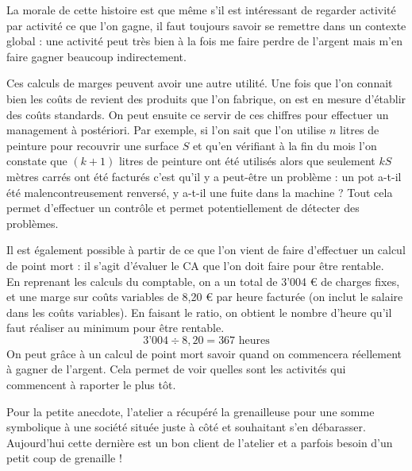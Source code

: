 La morale de cette histoire est que même s'il est intéressant 
de regarder activité par activité ce que l'on gagne, il faut 
toujours savoir se remettre dans un contexte global : une activité 
peut très bien à la fois me faire perdre de l'argent mais m'en 
faire gagner beaucoup indirectement. 

Ces calculs de marges peuvent avoir une autre utilité. 
Une fois que l'on connait bien les coûts de revient des produits que 
l'on fabrique, on est en mesure d'établir des coûts standards. 
On peut ensuite ce servir de ces chiffres pour effectuer un 
management à postériori. 
Par exemple, si l'on sait que l'on utilise $n$ litres de peinture 
pour recouvrir une surface $S$ et qu'en vérifiant à la fin du mois 
l'on constate que $(k+1)$ litres de peinture ont été utilisés alors que 
seulement $kS$ mètres carrés ont été facturés c'est qu'il y a peut-être 
un problème : un pot a-t-il été malencontreusement renversé, y a-t-il une 
fuite dans la machine ?
Tout cela permet d'effectuer un contrôle et permet potentiellement de 
détecter des problèmes.

Il est également possible à partir de ce que l'on vient de faire 
d'effectuer un calcul de point mort : il s'agit d'évaluer le CA 
que l'on doit faire pour être rentable. \\
En reprenant les calculs du comptable, on a un total de 3'004 \euro\/ 
de charges fixes, et une marge sur coûts variables de 8,20 \euro\/ par heure facturée
(on inclut le salaire dans les coûts variables). En faisant le ratio, 
on obtient le nombre d'heure qu'il faut réaliser au minimum pour être rentable.
\[
3\text{'}004 \div 8,20 = 367 \text{ heures}
\]
On peut grâce à un calcul de point mort savoir quand on commencera réellement 
à gagner de l'argent. Cela permet de voir quelles sont les activités qui 
commencent à raporter le plus tôt.

Pour la petite anecdote, l'atelier a récupéré la grenailleuse 
pour une somme symbolique  
à une société située juste à côté et souhaitant s'en débarasser. 
Aujourd'hui cette dernière est un bon client de l'atelier et 
a parfois besoin d'un petit coup de grenaille !